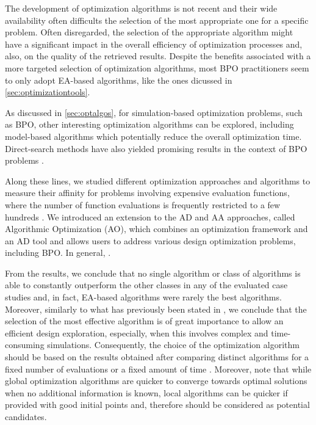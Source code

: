 The development of optimization algorithms is not recent and their wide availability often difficults the selection of the most appropriate one for a specific problem. Often disregarded, the selection of the appropriate algorithm might have a significant impact in the overall efficiency of optimization processes and, also, on the quality of the retrieved results\cite{Wolpert1997NFLT}. Despite the benefits associated with a more targeted selection of optimization algorithms, most \ac{BPO} practitioners seem to only adopt \ac{EA}-based algorithms, like the ones dicussed in \cref{sec:optimizationtools}. 

As discussed in \cref{sec:optalgos}, for simulation-based optimization problems, such as \ac{BPO}, other interesting optimization algorithms can be explored, including model-based algorithms which potentially reduce the overall optimization time\cite{Wortmann2017GABESTCHOICE}. Direct-search methods have also yielded promising results in the context of \ac{BPO} problems \cite{Waibel2018}. 

Along these lines, we studied different optimization approaches and algorithms to measure their affinity for problems involving expensive evaluation functions, where the number of function evaluations is frequently restricted to a few hundreds \cite{Caetano2018,Belem2018optimizeddesign,Belem2019MOO}. We introduced an extension to the \ac{AD} and \ac{AA} approaches, called Algorithmic Optimization (\ac{AO}), which combines an optimization framework and an \ac{AD} tool and allows users to address various design optimization problems, including \ac{BPO}. In general, .

From the results, we conclude that no single algorithm or class of algorithms is able to constantly outperform the other classes in any of the evaluated case studies and, in fact, \ac{EA}-based algorithms were rarely the best algorithms. Moreover, similarly to what has previously been stated in \cite{Wortmann2016BBO}, we conclude that the selection of the most effective algorithm is of great importance to allow an efficient design exploration, especially, when this involves complex and time-consuming simulations. Consequently, the choice of the optimization algorithm should be based on the results obtained after comparing distinct algorithms for a fixed number of evaluations or a fixed amount of time \cite{Hamdy2016}. Moreover, note that while global optimization algorithms are quicker to converge towards optimal solutions when no additional information is known, local algorithms can be quicker if provided with good initial points and, therefore should be considered as potential candidates. 
 
